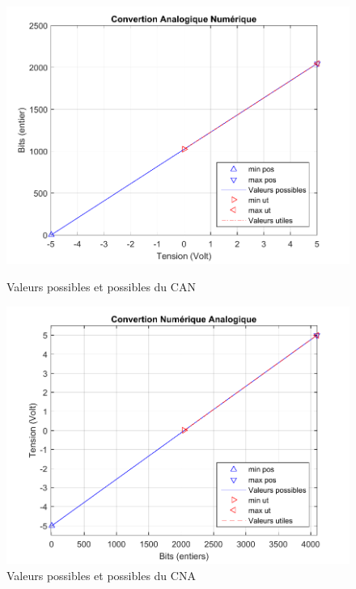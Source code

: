 \begin{figure}[!ht]%
\begin{minipage}{.5\textwidth}%
\centering
\includegraphics[width=\textwidth]{./VI/images/CAN_plage.pdf}
\caption{\label{fig:CAN_p}Valeurs possibles et possibles du CAN}
\end{minipage}%
\hfill%
\begin{minipage}{.5\textwidth}%
\centering
\includegraphics[width=\textwidth]{./VI/images/CNA_plage.pdf}
\caption{\label{fig:CNA_p}Valeurs possibles et possibles du CNA}
\end{minipage}%
\end{figure}


